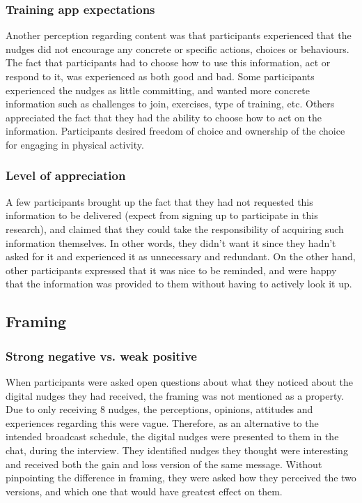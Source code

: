 \subsubsection{Training app expectations}
Another perception regarding content was that participants experienced that the nudges did not encourage any concrete or specific actions, choices or behaviours. The fact that participants had to choose how to use this information, act or respond to it, was experienced as both good and bad. Some participants experienced the nudges as little committing, and wanted more concrete information such as challenges to join, exercises, type of training, etc. Others appreciated the fact that they had the ability to choose how to act on the information. Participants desired freedom of choice and ownership of the choice for engaging in physical activity. 

\subsubsection{Level of appreciation}
A few participants brought up the fact that they had not requested this information to be delivered (expect from signing up to participate in this research), and claimed that they could take the responsibility of acquiring such information themselves. In other words, they didn't want it since they hadn't asked for it and experienced it as unnecessary and redundant. On the other hand, other participants expressed that it was nice to be reminded, and were happy that the information was provided to them without having to actively look it up. 

\subsection{Framing}
\subsubsection{Strong negative vs. weak positive}
When participants were asked open questions about what they noticed about the digital nudges they had received, the framing was not mentioned as a property. Due to only receiving 8 nudges, the perceptions, opinions, attitudes and experiences regarding this were vague. Therefore, as an alternative to the intended broadcast schedule, the digital nudges were presented to them in the chat, during the interview. They identified nudges they thought were interesting and received both the gain and loss version of the same message. Without pinpointing the difference in framing, they were asked how they perceived the two versions, and which one that would have greatest effect on them.

